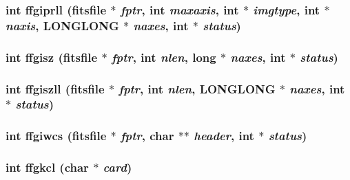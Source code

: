 \subsubsection{\setlength{\rightskip}{0pt plus 5cm}int ffgiprll (\bf{fitsfile} $\ast$ {\em fptr}, int {\em maxaxis}, int $\ast$ {\em imgtype}, int $\ast$ {\em naxis}, \bf{LONGLONG} $\ast$ {\em naxes}, int $\ast$ {\em status})}\label{fitsio__64_8h_bf531fec534d692d887dc85d0c415611}


\subsubsection{\setlength{\rightskip}{0pt plus 5cm}int ffgisz (\bf{fitsfile} $\ast$ {\em fptr}, int {\em nlen}, long $\ast$ {\em naxes}, int $\ast$ {\em status})}\label{fitsio__64_8h_8d84fada6d2b3d4c9e4153716437728c}


\subsubsection{\setlength{\rightskip}{0pt plus 5cm}int ffgiszll (\bf{fitsfile} $\ast$ {\em fptr}, int {\em nlen}, \bf{LONGLONG} $\ast$ {\em naxes}, int $\ast$ {\em status})}\label{fitsio__64_8h_9f3109f783dd55f01dd7e8130e9c355a}


\subsubsection{\setlength{\rightskip}{0pt plus 5cm}int ffgiwcs (\bf{fitsfile} $\ast$ {\em fptr}, char $\ast$$\ast$ {\em header}, int $\ast$ {\em status})}\label{fitsio__64_8h_4a3092c0f23da761c8063c15c1aba03e}


\subsubsection{\setlength{\rightskip}{0pt plus 5cm}int ffgkcl (char $\ast$ {\em card})}\label{fitsio__64_8h_89eaf0da53af08c1e07b6940a3ebdf32}


